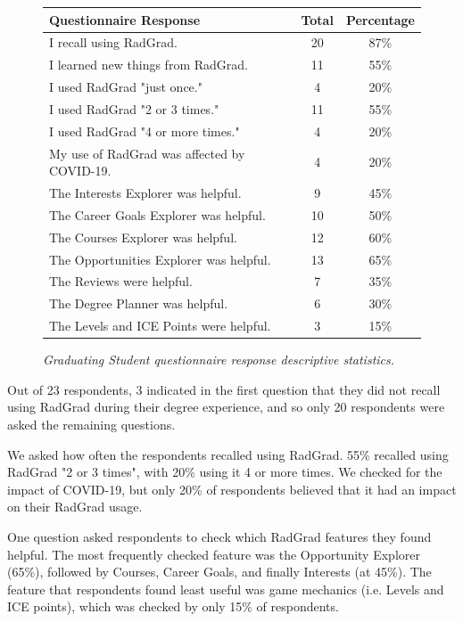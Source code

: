 \documentclass[acmsmall,nonacm]{acmart}
\begin{document}
\begin{figure}[th]
\centering
\small
\begin{tabular}{ p{4in} c c }
\hline
 Questionnaire Response &  Total & Percentage   \\
\hline
I recall using RadGrad.                          & 20 & 87\% \\
I learned new things from RadGrad.               & 11 & 55\% \\
I used RadGrad "just once."                      & 4 & 20\% \\
I used RadGrad "2 or 3 times."                   & 11 & 55\% \\
I used RadGrad "4 or more times."                & 4 & 20\% \\
My use of RadGrad was affected by COVID-19.         & 4 & 20\% \\
The Interests Explorer was helpful.              & 9 & 45\% \\
The Career Goals Explorer was helpful.           & 10 & 50\% \\
The Courses Explorer was helpful.                & 12 & 60\% \\
The Opportunities Explorer was helpful.          & 13 & 65\% \\
The Reviews were helpful.                        & 7 & 35\% \\
The Degree Planner was helpful.                  & 6 & 30\% \\
The Levels and ICE Points were helpful.          & 3 & 15\% \\
\hline
\end{tabular}
\caption{\em Graduating Student questionnaire response descriptive statistics.}
\normalsize
\label{fig:graduating-student-questionnaire-responses}
\end{figure}

Out of 23 respondents, 3 indicated in the first question that they did not recall using RadGrad during their degree experience, and so only 20 respondents were asked the remaining questions.

We asked how often the respondents recalled using RadGrad. 55\% recalled using RadGrad "2 or 3 times", with 20\% using it 4 or more times. We checked for the impact of COVID-19, but only 20\% of respondents believed that it had an impact on their RadGrad usage.

One question asked respondents to check which RadGrad features they found helpful.  The most frequently checked feature was the Opportunity Explorer (65\%), followed by Courses, Career Goals, and finally Interests (at 45\%).  The feature that respondents found least useful was game mechanics (i.e. Levels and ICE points), which was checked by only 15\% of respondents.
\end{document}
